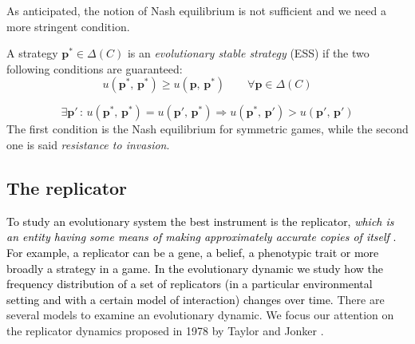 As anticipated, the notion of Nash equilibrium is not sufficient and
we need a more stringent condition.
\begin{defn}
A strategy $\mathbf{p}^{*}\in\Delta\left(C\right)$ is an \textit{evolutionary
stable strategy} (ESS) if the two following conditions are guaranteed:
\[
u\left(\mathbf{p}^{*},\,\mathbf{p}^{*}\right)\geq u\left(\mathbf{p},\,\mathbf{p}^{*}\right)\qquad\forall\mathbf{p}\in\Delta\left(C\right)
\]

\[
\exists\mathbf{p}'\,:\,u\left(\mathbf{p}^{*},\,\mathbf{p}^{*}\right)=u\left(\mathbf{p}',\,\mathbf{p}^{*}\right)\Rightarrow u\left(\mathbf{p}^{*},\,\mathbf{p}'\right)>u\left(\mathbf{p}',\,\mathbf{p}'\right)
\]
The first condition is the Nash equilibrium for symmetric games, while
the second one is said \textit{resistance to invasion}.
\end{defn}


\subsection{The replicator}

\textcolor{black}{To study an evolutionary system the best instrument
is the replicator, }\textit{\textcolor{black}{which is an entity having
some means of making approximately accurate copies of itself}}\textcolor{black}{{}
\cite{gintis_game_2009}. For example, a replicator can be a gene,
a belief, a phenotypic trait or more broadly a strategy in a game.}\textit{\textcolor{red}{{}
}}\textcolor{black}{In the evolutionary dynamic we study how the frequency
distribution of a set of replicators (in a particular environmental
setting and with a certain model of interaction) changes over time.}
There are several models to examine an evolutionary dynamic. We focus
our attention on the replicator dynamics proposed in 1978 by Taylor
and Jonker \cite{TaylorJ78}.

